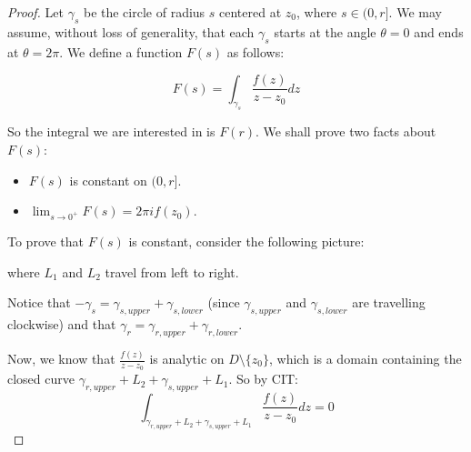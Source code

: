 \begin{proof}Let $\gamma_s$ be the circle of radius $s$ centered at $z_0$, where $s\in(0,r]$. We may assume, without loss of generality, that each $\gamma_s$ starts at the angle $\theta = 0$ and ends at $\theta = 2\pi$. We define a function $F(s)$ as follows:

$$F(s) = \int_{\gamma_s}\frac{f(z)}{z-z_0}dz$$

So the integral we are interested in is $F(r)$. We shall prove two facts about $F(s)$:

\begin{itemize}
\item $F(s)$ is constant on $(0,r]$.
\item $\lim_{s\rightarrow 0^+} F(s) = 2\pi i f(z_0)$.
\end{itemize}

To prove that $F(s)$ is constant, consider the following picture:

\begin{center}
\end{center}

\noin where $L_1$ and $L_2$ travel from left to right.

Notice that $-\gamma_s = \gamma_{s,upper} + \gamma_{s,lower}$ (since $\gamma_{s,upper}$ and $\gamma_{s,lower}$ are travelling clockwise) and that $\gamma_r = \gamma_{r,upper} + \gamma_{r,lower}$.

Now, we know that $\frac{f(z)}{z-z_0}$ is analytic on $D\setminus \{z_0\}$, which is a domain containing the closed curve $\gamma_{r,upper} + L_2 + \gamma_{s,upper} + L_1$. So by CIT:
$$\int_{\gamma_{r,upper} + L_2 + \gamma_{s,upper} + L_1} \frac{f(z)}{z-z_0}dz = 0$$


\end{proof}
